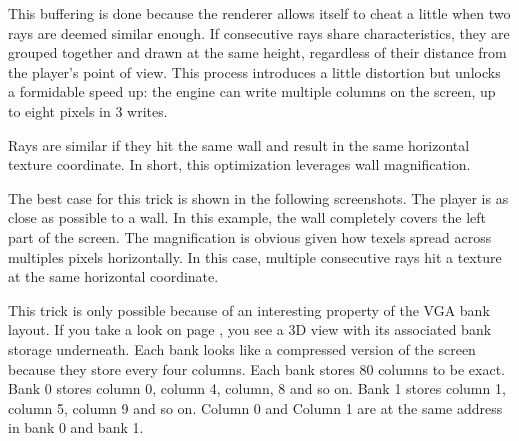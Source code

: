\par
This buffering is done because the renderer allows itself to cheat a little when two rays are deemed similar enough. If consecutive rays share characteristics, they are grouped together and drawn at the same height, regardless of their distance from the player's point of view. This process introduces a little distortion but unlocks a formidable speed up: the engine can write multiple columns on the screen, up to eight pixels in 3 writes.\\
\par
Rays are similar if they hit the same wall and result in the same  horizontal texture coordinate. In short, this optimization leverages wall magnification.\\

\par
The best case for this trick is shown in the following screenshots. The player is as close as possible to a wall. In this example, the wall completely covers the left part of the screen. The magnification is obvious given how texels spread across multiples pixels horizontally. In this case, multiple consecutive rays hit a texture at the same horizontal coordinate.\\
\begin{figure}[H]
 \centering
\end{figure}

This trick is only possible because of an interesting property of the VGA bank layout. If you take a look on page \pageref{vga_layout}, you see a 3D view with its associated bank storage underneath. Each bank looks like a compressed version of the screen because they store every four columns. Each bank stores 80 columns to be exact. Bank 0 stores column 0, column 4, column, 8 and so on. Bank 1 stores column 1, column 5, column 9 and so on. Column 0 and Column 1 are at the same address in bank 0 and bank 1.
 \par
  \begin{minipage}{\textwidth}
 
\centering
\vspace*{0.3cm}
\label{vga_layout}
\centering


 \end{minipage}

\par

